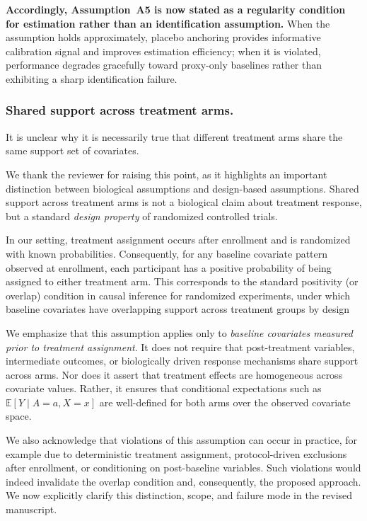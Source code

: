 {\textbf{Accordingly, Assumption~A5 is now stated as a regularity condition for estimation rather than an identification assumption.} When the assumption holds approximately, placebo anchoring provides informative calibration signal and improves estimation efficiency; when it is violated, performance degrades gracefully toward proxy-only baselines rather than exhibiting a sharp identification failure.

}


\subsubsection{Shared support across treatment arms.}  
It is unclear why it is necessarily true that different treatment arms share the same support set of covariates.

{\color{blue}
We thank the reviewer for raising this point, as it highlights an important distinction between biological assumptions and design-based assumptions. Shared support across treatment arms is not a biological claim about treatment response, but a standard \emph{design property} of randomized controlled trials.

In our setting, treatment assignment occurs after enrollment and is randomized with known probabilities. Consequently, for any baseline covariate pattern observed at enrollment, each participant has a positive probability of being assigned to either treatment arm. This corresponds to the standard positivity (or overlap) condition in causal inference for randomized experiments, under which baseline covariates have overlapping support across treatment groups by design \citep{imbens2015causal, hernan2010causal, dahabreh2023efficient}

We emphasize that this assumption applies only to \emph{baseline covariates measured prior to treatment assignment}. It does not require that post-treatment variables, intermediate outcomes, or biologically driven response mechanisms share support across arms. Nor does it assert that treatment effects are homogeneous across covariate values. Rather, it ensures that conditional expectations such as $\mathbb{E}[Y \mid A=a, X=x]$ are well-defined for both arms over the observed covariate space.

We also acknowledge that violations of this assumption can occur in practice, for example due to deterministic treatment assignment, protocol-driven exclusions after enrollment, or conditioning on post-baseline variables. Such violations would indeed invalidate the overlap condition and, consequently, the proposed approach. We now explicitly clarify this distinction, scope, and failure mode in the revised manuscript.
}

